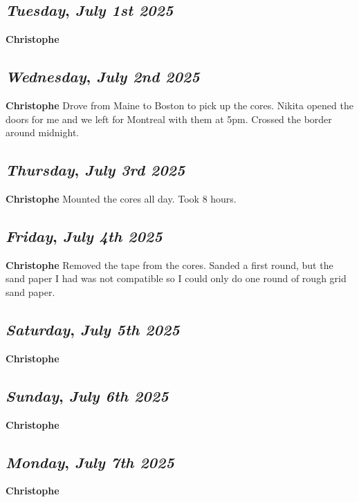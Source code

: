 \begin{center}
\section*{\month}
\end{center}

\def\day{\textit{July 1st 2025}}
\def\weekday{\textit{Tuesday}}
\subsection*{\weekday, \day}
\textbf {Christophe}

\def\day{\textit{July 2nd 2025}}
\def\weekday{\textit{Wednesday}}
\subsection*{\weekday, \day}
\textbf {Christophe}
Drove from Maine to Boston to pick up the cores. Nikita opened the doors for me and we left for Montreal with them at 5pm. Crossed the border around midnight.

\def\day{\textit{July 3rd 2025}}
\def\weekday{\textit{Thursday}}
\subsection*{\weekday, \day}
\textbf {Christophe}
Mounted the cores all day. Took 8 hours.

\def\day{\textit{July 4th 2025}}
\def\weekday{\textit{Friday}}
\subsection*{\weekday, \day}
\textbf {Christophe}
Removed the tape from the cores. Sanded a first round, but the sand paper I had was not compatible so I could only do one round of rough grid sand paper.
\def\day{\textit{July 5th 2025}}
\def\weekday{\textit{Saturday}}
\subsection*{\weekday, \day}
\textbf {Christophe}

\def\day{\textit{July 6th 2025}}
\def\weekday{\textit{Sunday}}
\subsection*{\weekday, \day}
\textbf {Christophe}

\def\day{\textit{July 7th 2025}}
\def\weekday{\textit{Monday}}
\subsection*{\weekday, \day}
\textbf {Christophe}

